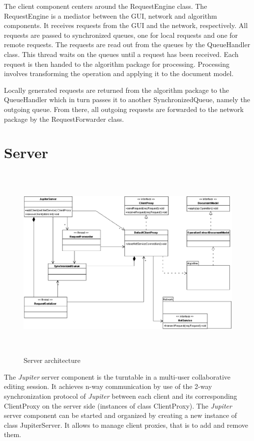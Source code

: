 The client component centers around the RequestEngine class. The RequestEngine is a mediator between the GUI, network and algorithm components. It receives requests from the GUI and the network, respectively. All requests are passed to synchronized queues, one for local requests and one for remote requests. The requests are read out from the queues by the QueueHandler class. This thread waits on the queues until a request has been received. Each request is then handed to the algorithm package for processing. Processing involves transforming the operation and applying it to the document model. 

Locally generated requests are returned from the algorithm package  to the QueueHandler which in turn passes it to another SynchronizedQueue, namely the outgoing queue. From there, all outgoing requests are forwarded to the network package by the RequestForwarder class. 


\section{Server}
\begin{figure}[H]
\centering
\includegraphics[height=9.8cm,width=15.36cm]{../../images/algo-impl/server_diagram.eps}
\caption{Server architecture}
\label{Server architecture}
\end{figure}

The \emph{Jupiter} server component is the turntable in a multi-user collaborative editing session. It achieves n-way communication by use of the 2-way synchronization protocol of \emph{Jupiter} between each client and its corresponding ClientProxy on the server side (instances of class ClientProxy). The \emph{Jupiter} server component can be started and organized by creating a new instance of class JupiterServer. It allows to manage client proxies, that is to add and remove them.

